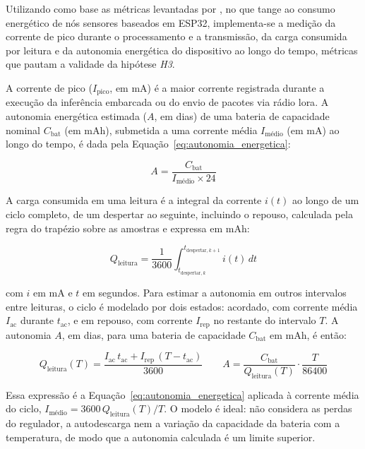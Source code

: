 
Utilizando como base as métricas levantadas por , no
que tange ao consumo energético de nós sensores baseados em ESP32,
implementa-se a medição da corrente de pico durante o processamento e a
transmissão, da carga consumida por leitura e da autonomia energética do
dispositivo ao longo do tempo, métricas que pautam a validade da hipótese
\textit{H3}.

A corrente de pico ($I_{\text{pico}}$, em mA) é a maior corrente registrada
durante a execução da inferência embarcada ou do envio de pacotes via rádio
\gls{lora}. A autonomia energética estimada ($A$, em dias) de uma bateria de
capacidade nominal $C_{\text{bat}}$ (em mAh), submetida a uma corrente média
$I_{\text{médio}}$ (em mA) ao longo do tempo, é dada pela
Equação~\eqref{eq:autonomia_energetica}:

\begin{equation}
    \label{eq:autonomia_energetica}
    A = \frac{C_{\text{bat}}}{I_{\text{médio}} \times 24}
\end{equation}

A carga consumida em uma leitura é a integral da corrente $i(t)$ ao
longo de um ciclo completo, de um despertar ao seguinte, incluindo o repouso, calculada pela
regra do trapézio sobre as amostras e expressa em mAh:

\begin{equation}
    \label{eq:carga_leitura}
    Q_{\mathrm{leitura}} = \frac{1}{3600}\int_{t_{\mathrm{despertar},k}}^{t_{\mathrm{despertar},k+1}} i(t)\,dt
\end{equation}

\noindent com $i$ em mA e $t$ em segundos. Para estimar a autonomia em outros intervalos
entre leituras, o ciclo é modelado por dois estados: acordado, com corrente média
$I_{\mathrm{ac}}$ durante $t_{\mathrm{ac}}$, e em repouso, com corrente $I_{\mathrm{rep}}$
no restante do intervalo $T$. A autonomia $A$, em dias, para uma bateria de capacidade
$C_{\mathrm{bat}}$ em mAh, é então:

\begin{equation}
    \label{eq:autonomia_modelo}
    Q_{\mathrm{leitura}}(T) = \frac{I_{\mathrm{ac}}\,t_{\mathrm{ac}} + I_{\mathrm{rep}}\,(T - t_{\mathrm{ac}})}{3600}
    \qquad
    A = \frac{C_{\mathrm{bat}}}{Q_{\mathrm{leitura}}(T)} \cdot \frac{T}{86400}
\end{equation}

\noindent Essa expressão é a Equação~\eqref{eq:autonomia_energetica} aplicada à corrente
média do ciclo, $I_{\text{médio}} = 3600\,Q_{\mathrm{leitura}}(T)/T$. O modelo é ideal: não considera as perdas do regulador, a autodescarga nem a variação da
capacidade da bateria com a temperatura, de modo que a autonomia calculada é um limite
superior.